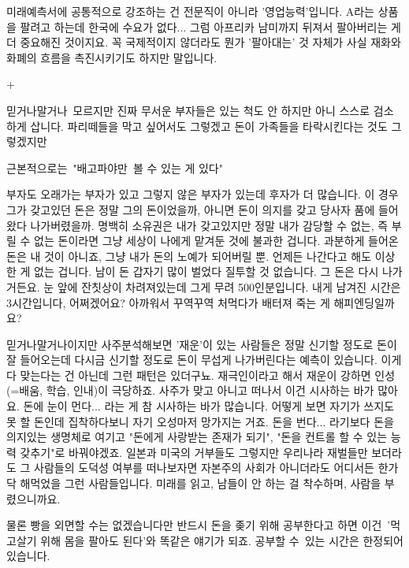 미래예측서에 공통적으로 강조하는 건 전문직이 아니라 '영업능력'입니다.
A라는 상품을 팔려고 하는데 한국에 수요가 없다... 그럼 아프리카 남미까지 뒤져서 팔아버리는 게 더 중요해진 것이지요.
꼭 국제적이지 않더라도 뭔가 '팔아대는' 것 자체가 사실 재화와 화폐의 흐름을 촉진시키기도 하지만 말입니다.
\vspace{5mm}

+
\vspace{5mm}

믿거나말거나 모르지만 진짜 무서운 부자들은 있는 척도 안 하지만 아니 스스로 검소하게 삽니다.
파리떼들을 막고 싶어서도 그렇겠고 돈이 가족들을 타락시킨다는 것도 그렇겠지만
\vspace{5mm}

근본적으로는 "배고파야만 볼 수 있는 게 있다"
\vspace{5mm}

부자도 오래가는 부자가 있고 그렇지 않은 부자가 있는데 후자가 더 많습니다.
이 경우 그가 갖고있던 돈은 정말 그의 돈이었을까, 아니면 돈이 의지를 갖고 당사자 품에 들어왔다 나가버렸을까.
명백히 소유권은 내가 갖고있지만 정말 내가 감당할 수 없는, 즉 부릴 수 없는 돈이라면 그냥 세상이 나에게 맡겨둔 것에 불과한 겁니다.
과분하게 들어온 돈은 내 것이 아니죠, 그냥 내가 돈의 노예가 되어버릴 뿐. 언제든 나간다고 해도 이상한 게 없는 겁니다.
남이 돈 갑자기 많이 벌었다 질투할 것 없습니다. 그 돈은 다시 나가거든요.
눈 앞에 잔칫상이 차려져있는데 그게 무려 500인분입니다. 내게 남겨진 시간은 3시간입니다, 어쩌겠어요?
아까워서 꾸역꾸역 처먹다가 배터져 죽는 게 해피엔딩일까요?
\vspace{5mm}

믿거나말거나이지만 사주분석해보면 '재운'이 있는 사람들은 정말 신기할 정도로 돈이 잘 들어오는데
다시금 신기할 정도로 돈이 무섭게 나가버린다는 예측이 있습니다. 이게 다 맞는다는 건 아닌데 그런 패턴은 있더구뇨.
재극인이라고 해서 재운이 강하면 인성(=배움, 학습, 인내)이 극당하죠. 사주가 맞고 아니고 떠나서 이건 시사하는 바가 많아요.
돈에 눈이 먼다... 라는 게 참 시사하는 바가 많습니다. 어떻게 보면 자기가 쓰지도 못 할 돈인데 집착하다보니 자기 오성마저 망가지는 거죠.
돈을 번다... 라기보다 돈을 의지있는 생명체로 여기고 "돈에게 사랑받는 존재가 되기", "돈을 컨트롤 할 수 있는 능력 갖추기"로 바꿔야겠죠.
일본과 미국의 거부들도 그렇지만 우리나라 재벌들만 보더라도 그 사람들의 도덕성 여부를 떠나보자면
자본주의 사회가 아니더라도 어디서든 한가닥 해먹었을 그런 사람들입니다. 미래를 읽고, 남들이 안 하는 걸 착수하며, 사람을 부렸으니까요.
\vspace{5mm}

물론 빵을 외면할 수는 없겠습니다만 반드시 돈을 좆기 위해 공부한다고 하면 이건 '먹고살기 위해 몸을 팔아도 된다'와 똑같은 얘기가 되죠.
공부할 수 있는 시간은 한정되어 있습니다.
\vspace{5mm}






